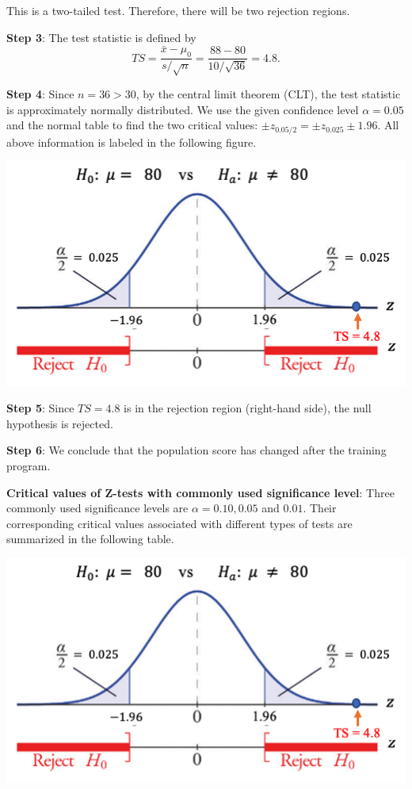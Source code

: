 \documentclass[
]{book}
\begin{document}
This is a two-tailed test. Therefore, there will be two rejection regions.

\textbf{Step 3}: The test statistic is defined by
\[TS = \frac{\bar{x} - \mu_0}{s/\sqrt{n}} = \frac{88 - 80}{10/\sqrt{36}} = 4.8.\]

\textbf{Step 4}: Since \(n = 36 > 30\), by the central limit theorem (CLT), the test statistic is approximately normally distributed. We use the given confidence level \(\alpha = 0.05\) and the normal table to find the two critical values: \(\pm z_{0.05/2} = \pm z_{0.025} \pm 1.96\). All above information is labeled in the following figure.

\begin{center}\includegraphics[width=0.5\linewidth]{week08/example09} \end{center}

\textbf{Step 5}: Since \(TS = 4.8\) is in the rejection region (right-hand side), the null hypothesis is rejected.

\textbf{Step 6}: We conclude that the population score has changed after the training program.

\hfill\break

\textbf{Critical values of Z-tests with commonly used significance level}: Three commonly used significance levels are \(\alpha = 0.10, 0.05\) and \(0.01\). Their corresponding critical values associated with different types of tests are summarized in the following table.

\hfill\break

\begin{center}\includegraphics[width=0.5\linewidth]{week08/example09} \end{center}

\hfill\break
\end{document}
